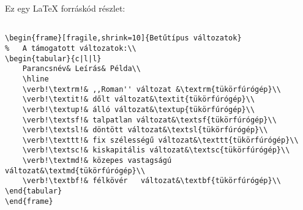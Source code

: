 \documentclass{article}
\begin{document}
Ez egy \LaTeX{} forráskód részlet:
\begin{verbatim}

\begin{frame}[fragile,shrink=10]{Betűtípus változatok}
%	A támogatott változatok:\\		
\begin{tabular}{c|l|l}	
	Parancsnév& Leírás& Példa\\	     
	\hline
	\verb!\textrm!& ,,Roman'' változat &\textrm{tükörfúrógép}\\
	\verb!\textit!& dőlt változat&\textit{tükörfúrógép}\\
	\verb!\textup!& álló változat&\textup{tükörfúrógép}\\
	\verb!\textsf!& talpatlan változat&\textsf{tükörfúrógép}\\
	\verb!\textsl!& döntött változat&\textsl{tükörfúrógép}\\
	\verb!\texttt!& fix szélességű változat&\texttt{tükörfúrógép}\\
	\verb!\textsc!& kiskapitális változat&\textsc{tükörfúrógép}\\
	\verb!\textmd!& közepes vastagságú változat&\textmd{tükörfúrógép}\\
	\verb!\textbf!& félkövér   változat&\textbf{tükörfúrógép}\\
\end{tabular}
\end{frame}

\end{verbatim}
\end{document}
